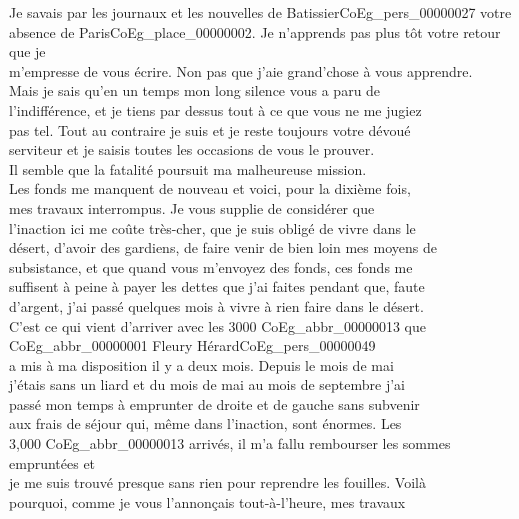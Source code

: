 \documentclass{book}
\begin{document}
Je savais par les journaux et les nouvelles de Batissier\gls{CoEg_pers_00000027} votre\\
absence de Paris\gls{CoEg_place_00000002}. Je n’apprends pas plus tôt votre retour que je\\
m’empresse de vous écrire. Non pas que j’aie grand’chose à vous apprendre.\\
Mais je sais qu’en un temps mon long silence vous a paru de\\
l’indifférence, et je tiens par dessus tout à ce que vous ne me jugiez\\
pas tel. Tout au contraire je suis et je reste toujours votre dévoué\\
serviteur et je saisis toutes les occasions de vous le prouver.\\
\indent Il semble que la fatalité poursuit ma malheureuse mission.\\
Les fonds me manquent de nouveau et voici, pour la dixième fois,\\
mes travaux interrompus. Je vous supplie de considérer que\\
l’inaction ici me coûte très-cher, que je suis obligé de vivre dans le\\
désert, d’avoir des gardiens, de faire venir de bien loin mes moyens de\\
subsistance, et que quand vous m’envoyez des fonds, ces fonds me\\
suffisent à peine à payer les dettes que j’ai faites pendant que, faute\\
d’argent, j’ai passé quelques mois à vivre à rien faire dans le désert.\\
C’est ce qui vient d’arriver avec les 3000 \gls{CoEg_abbr_00000013} que \gls{CoEg_abbr_00000001} Fleury Hérard\gls{CoEg_pers_00000049}\\
a mis à ma disposition il y a deux mois. Depuis le mois de mai\\
j’étais sans un liard et du mois de mai au mois de septembre j’ai\\
passé mon temps à emprunter de droite et de gauche sans subvenir\\
aux frais de séjour qui, même dans l’inaction, sont énormes. Les\\
3,000 \gls{CoEg_abbr_00000013} arrivés, il m’a fallu rembourser les sommes empruntées et\\
je me suis trouvé presque sans rien pour reprendre les fouilles. Voilà\\
pourquoi, comme je vous l’annonçais tout-à-l’heure, mes travaux\\
\end{document}
